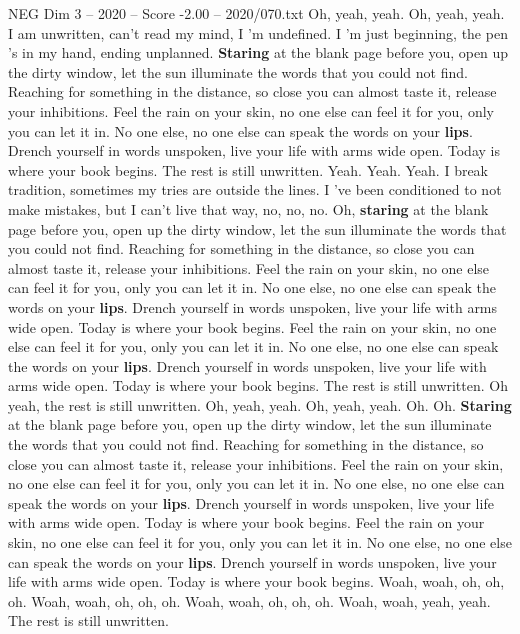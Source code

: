 \begin{textsample}{NEG Dim 3 – 2020 – Score -2.00 – 2020/070.txt}  \label{ex:f3_neg_031}
Oh, yeah, yeah.
Oh, yeah, yeah.
I am unwritten, can't read my mind, I 'm undefined.
I 'm just beginning, the pen 's in my hand, ending unplanned. \textbf{Staring} at the blank page before you, open up the dirty window, let the sun illuminate the words that you could not find.
Reaching for something in the distance, so close you can almost taste it, release your inhibitions.
Feel the rain on your skin, no one else can feel it for you, only you can let it in.
No one else, no one else can speak the words on your \textbf{lips}.
Drench yourself in words unspoken, live your life with arms wide open.
Today is where your book begins.
The rest is still unwritten.
Yeah.
Yeah.
Yeah.
I break tradition, sometimes my tries are outside the lines.
I 've been conditioned to not make mistakes, but I can't live that way, no, no, no.
Oh, \textbf{staring} at the blank page before you, open up the dirty window, let the sun illuminate the words that you could not find.
Reaching for something in the distance, so close you can almost taste it, release your inhibitions.
Feel the rain on your skin, no one else can feel it for you, only you can let it in.
No one else, no one else can speak the words on your \textbf{lips}.
Drench yourself in words unspoken, live your life with arms wide open.
Today is where your book begins.
Feel the rain on your skin, no one else can feel it for you, only you can let it in.
No one else, no one else can speak the words on your \textbf{lips}.
Drench yourself in words unspoken, live your life with arms wide open.
Today is where your book begins.
The rest is still unwritten.
Oh yeah, the rest is still unwritten.
Oh, yeah, yeah.
Oh, yeah, yeah.
Oh.
Oh. \textbf{Staring} at the blank page before you, open up the dirty window, let the sun illuminate the words that you could not find.
Reaching for something in the distance, so close you can almost taste it, release your inhibitions.
Feel the rain on your skin, no one else can feel it for you, only you can let it in.
No one else, no one else can speak the words on your \textbf{lips}.
Drench yourself in words unspoken, live your life with arms wide open.
Today is where your book begins.
Feel the rain on your skin, no one else can feel it for you, only you can let it in.
No one else, no one else can speak the words on your \textbf{lips}.
Drench yourself in words unspoken, live your life with arms wide open.
Today is where your book begins.
Woah, woah, oh, oh, oh.
Woah, woah, oh, oh, oh.
Woah, woah, oh, oh, oh.
Woah, woah, yeah, yeah.
The rest is still unwritten.

\end{textsample}

